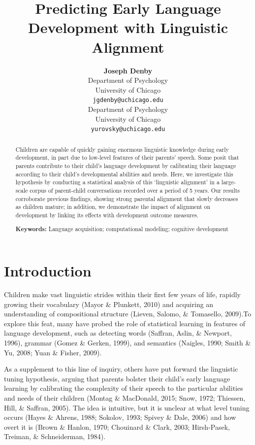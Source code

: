 \documentclass[10pt, letterpaper]{article}
\title{Predicting Early Language Development with Linguistic Alignment}
\author{{\large \bf Joseph Denby} \\ Department of Psychology \\ University of Chicago \\ \texttt{jgdenby@uchicago.edu} \And {\large \bf Daniel Yurovsky} \\ Department of Psychology\\ University of Chicago \\\texttt{yurovsky@uchicago.edu}}
\begin{document}
\maketitle

\begin{abstract}
Children are capable of quickly gaining enormous linguistic knowledge
during early development, in part due to low-level features of their
parents' speech. Some posit that parents contribute to their child's
language development by calibrating their language according to their
child's developmental abilities and needs. Here, we investigate this
hypothesis by conducting a statistical analysis of this `linguistic
alignment' in a large-scale corpus of parent-child conversations
recorded over a period of 5 years. Our results corroborate previous
findings, showing strong parental alignment that slowly decreases as
children mature; in addition, we demonstrate the impact of alignment on
development by linking its effects with development outcome measures.

\textbf{Keywords:}
Language acquisition; computational modeling; cognitive development
\end{abstract}

\hypertarget{introduction}{%
\section{Introduction}\label{introduction}}

Children make vast linguistic strides within their first few years of
life, rapidly growing their vocabulary (Mayor \& Plunkett, 2010) and
acquiring an understanding of compositional structure (Lieven, Salomo,
\& Tomasello, 2009).To explore this feat, many have probed the role of
statistical learning in features of language development, such as
detecting words (Saffran, Aslin, \& Newport, 1996), grammar (Gomez \&
Gerken, 1999), and semantics (Naigles, 1990; Smith \& Yu, 2008; Yuan \&
Fisher, 2009).

As a supplement to this line of inquiry, others have put forward the
linguistic tuning hypothesis, arguing that parents bolster their child's
early language learning by calibrating the complexity of their speech to
the particular abilities and needs of their children (Montag \&
MacDonald, 2015; Snow, 1972; Thiessen, Hill, \& Saffran, 2005). The idea
is intuitive, but it is unclear at what level tuning occurs (Hayes \&
Ahrens, 1988; Sokolov, 1993; Spivey \& Dale, 2006) and how overt it is
(Brown \& Hanlon, 1970; Chouinard \& Clark, 2003; Hirsh-Pasek, Treiman,
\& Schneiderman, 1984).
\end{document}
